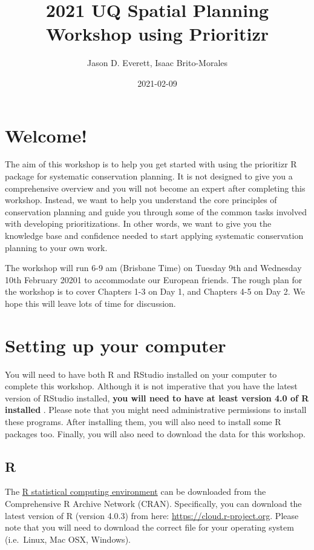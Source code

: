 \documentclass[
  12pt,
]{book}
\title{2021 UQ Spatial Planning Workshop using Prioritizr}
\author{Jason D. Everett, Isaac Brito-Morales}
\date{2021-02-09}
\begin{document}
\maketitle

{
\hypersetup{linkcolor=}
\setcounter{tocdepth}{1}
\tableofcontents
}
\hypertarget{welcome}{%
\chapter{Welcome!}\label{welcome}}

The aim of this workshop is to help you get started with using the prioritizr R package for systematic conservation planning. It is not designed to give you a comprehensive overview and you will not become an expert after completing this workshop. Instead, we want to help you understand the core principles of conservation planning and guide you through some of the common tasks involved with developing prioritizations. In other words, we want to give you the knowledge base and confidence needed to start applying systematic conservation planning to your own work.

The workshop will run 6-9 am (Brisbane Time) on Tuesday 9th and Wednesday 10th February 20201 to accommodate our European friends. The rough plan for the workshop is to cover Chapters 1-3 on Day 1, and Chapters 4-5 on Day 2. We hope this will leave lots of time for discussion.

\hypertarget{setup}{%
\chapter{Setting up your computer}\label{setup}}

You will need to have both R and RStudio installed on your computer to complete this workshop. Although it is not imperative that you have the latest version of RStudio installed, \textbf{you will need to have at least version 4.0 of R installed }. Please note that you might need administrative permissions to install these programs. After installing them, you will also need to install some R packages too. Finally, you will also need to download the data for this workshop.

\hypertarget{r}{%
\section{R}\label{r}}

The \href{https://www.r-project.org}{R statistical computing environment} can be downloaded from the Comprehensive R Archive Network (CRAN). Specifically, you can download the latest version of R (version 4.0.3) from here: \url{https://cloud.r-project.org}. Please note that you will need to download the correct file for your operating system (i.e.~Linux, Mac OSX, Windows).
\end{document}
